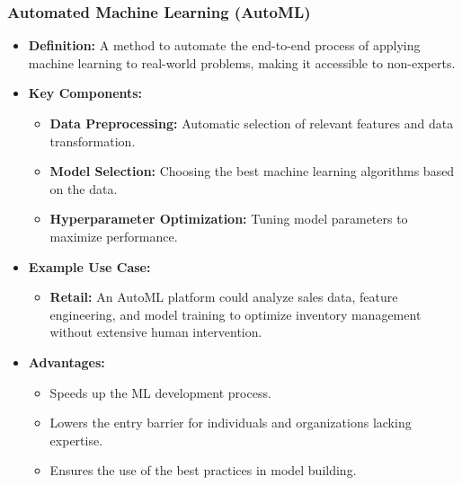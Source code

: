 \documentclass[aspectratio=169]{beamer}
\begin{document}
\begin{frame}[fragile]
    \frametitle{Automated Machine Learning (AutoML)}
    \begin{itemize}
        \item \textbf{Definition:} A method to automate the end-to-end process of applying machine learning to real-world problems, making it accessible to non-experts.
        \item \textbf{Key Components:}
        \begin{itemize}
            \item \textbf{Data Preprocessing:} Automatic selection of relevant features and data transformation.
            \item \textbf{Model Selection:} Choosing the best machine learning algorithms based on the data.
            \item \textbf{Hyperparameter Optimization:} Tuning model parameters to maximize performance.
        \end{itemize}
        \item \textbf{Example Use Case:}
        \begin{itemize}
            \item \textbf{Retail:} An AutoML platform could analyze sales data, feature engineering, and model training to optimize inventory management without extensive human intervention.
        \end{itemize}
        \item \textbf{Advantages:}
        \begin{itemize}
            \item Speeds up the ML development process.
            \item Lowers the entry barrier for individuals and organizations lacking expertise.
            \item Ensures the use of the best practices in model building.
        \end{itemize}
    \end{itemize}
\end{frame}
\end{document}

